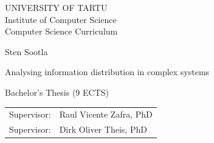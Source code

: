 \documentclass[12pt]{article}
\begin{document}
\thispagestyle{empty}
\begin{center}

\large
UNIVERSITY OF TARTU\\[2mm]
Institute of Computer Science\\
Computer Science Curriculum\\[2mm]

\vspace{25mm}

\Large Sten Sootla

\vspace{4mm}

\huge Analysing information distribution in complex systems

\vspace{20mm}

\Large Bachelor's Thesis (9 ECTS)

\end{center}

\vspace{2mm}

\begin{flushright}
 {
 \setlength{\extrarowheight}{5pt}
 \begin{tabular}{r l} 
  \sffamily Supervisor: & \sffamily Raul Vicente Zafra, PhD \\
  \sffamily Supervisor: & \sffamily Dirk Oliver Theis, PhD
 \end{tabular}
 }
\end{flushright}

\vspace{10mm}

\vspace{2mm}



\vspace{2mm}


\vspace{8mm}
\end{document}

